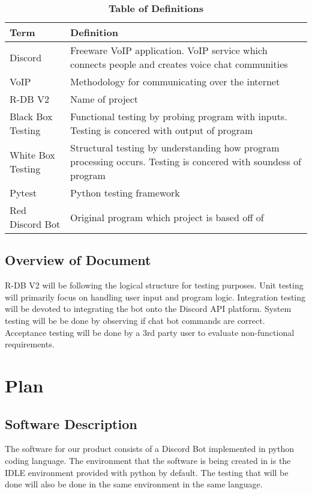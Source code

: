 \documentclass[12pt, titlepage]{article}
\begin{document}
\begin{table}[!htbp]
\caption{\textbf{Table of Definitions}} \label{Table}

\begin{tabularx}{\textwidth}{p{3cm}X}
\toprule
\textbf{Term} & \textbf{Definition}\\
\midrule
Discord & Freeware VoIP application. VoIP service which connects people and creates voice chat communities\\
VoIP & Methodology for communicating over the internet\\
R-DB V2 & Name of project\\
Black Box Testing & Functional testing by probing program with inputs. Testing is concered with output of program\\
White Box Testing & Structural testing by understanding how program processing occurs. Testing is concered with soundess of program\\
Pytest & Python testing framework\\
Red Discord Bot & Original program which project is based off of\\
\bottomrule
\end{tabularx}

\end{table}	

\subsection{Overview of Document}
R-DB V2 will be following the logical structure for testing purposes. Unit testing will primarily focus on handling user input and program logic. Integration testing will be devoted to integrating the bot onto the Discord API platform. System testing will be be done by observing if chat bot commands are correct. Acceptance testing will be done by a 3rd party user to evaluate non-functional requirements.  

\section{Plan}
	
\subsection{Software Description}

The software for our product consists of a Discord Bot implemented in python coding language. The environment that the software is being created in is the IDLE environment provided with python by default. The testing that will be done will also be done in the same environment in the same language. 
\end{document}
